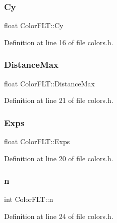 \subsubsection{\texorpdfstring{Cy}{Cy}}
{\footnotesize\ttfamily float Color\+F\+L\+T\+::\+Cy}



Definition at line 16 of file colors.\+h.

\mbox{\label{struct_color_f_l_t_a1a49b8e86d11b8179e100d356198f186}} 
\subsubsection{\texorpdfstring{Distance\+Max}{DistanceMax}}
{\footnotesize\ttfamily float Color\+F\+L\+T\+::\+Distance\+Max}



Definition at line 21 of file colors.\+h.

\mbox{\label{struct_color_f_l_t_a142bf1562c32e79af417a8258e764514}} 
\subsubsection{\texorpdfstring{Exps}{Exps}}
{\footnotesize\ttfamily float Color\+F\+L\+T\+::\+Exps}



Definition at line 20 of file colors.\+h.

\mbox{\label{struct_color_f_l_t_a43254e86f118bc92dd21f5a58013e7e4}} 
\subsubsection{\texorpdfstring{n}{n}}
{\footnotesize\ttfamily int Color\+F\+L\+T\+::n}



Definition at line 24 of file colors.\+h.

\mbox{\label{struct_color_f_l_t_aa4795f7bd4044069e9b534be7cceb117}} 
